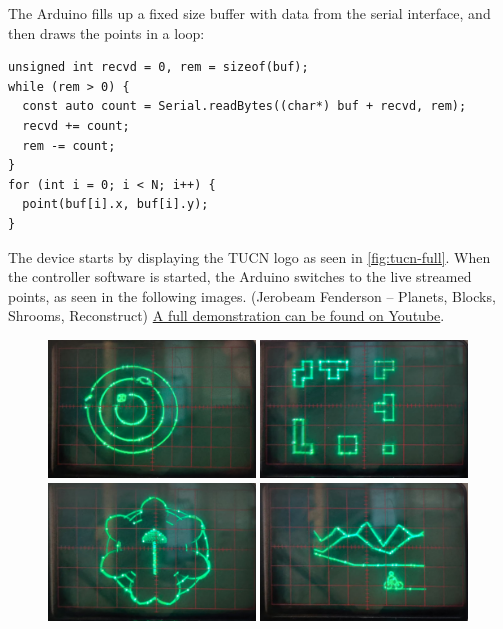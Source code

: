 \documentclass[12pt]{article}
\begin{document}
The Arduino fills up a fixed size buffer with data from the serial interface, and then draws the points in a loop:

\begin{lstlisting}
unsigned int recvd = 0, rem = sizeof(buf);
while (rem > 0) {
  const auto count = Serial.readBytes((char*) buf + recvd, rem);
  recvd += count;
  rem -= count;
}
for (int i = 0; i < N; i++) {
  point(buf[i].x, buf[i].y);
}
\end{lstlisting}

The device starts by displaying the TUCN logo as seen in \autoref{fig:tucn-full}. When the controller software is started, the Arduino switches to the live streamed points, as seen in the following images. (Jerobeam Fenderson -- Planets, Blocks, Shrooms, Reconstruct) \href{https://youtu.be/MOuCXOf-fcU}{A full demonstration can be found on Youtube}.

\begin{figure}[h]
\centering
\includegraphics[width=0.49\textwidth]{images/demo1.png}\hspace{0.01\textwidth}
\includegraphics[width=0.49\textwidth]{images/demo2.png}\vspace{0.01\textwidth}
\includegraphics[width=0.49\textwidth]{images/demo3.png}\hspace{0.01\textwidth}
\includegraphics[width=0.49\textwidth]{images/demo4.png}
\end{figure}
\end{document}
